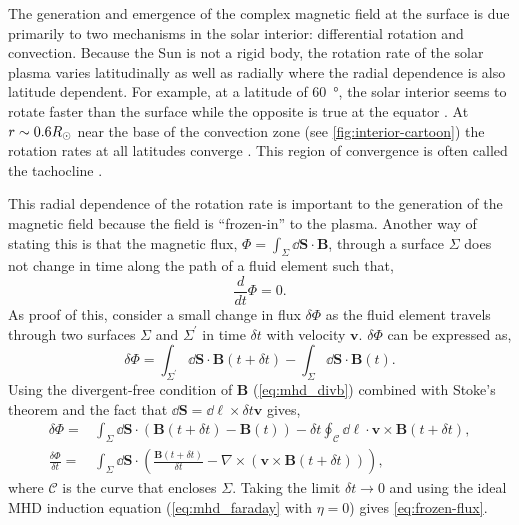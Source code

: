 The generation and emergence of the complex magnetic field at the surface is due primarily to two mechanisms in the solar interior: differential rotation and convection. Because the Sun is not a rigid body, the rotation rate of the solar plasma varies latitudinally as well as radially where the radial dependence is also latitude dependent. For example, at a latitude of \SI{60}{\degree}, the solar interior seems to rotate faster than the surface while the opposite is true at the equator \citep{thompson_differential_1996}. At $r\sim0.6R_\odot$ near the base of the convection zone (see \autoref{fig:interior-cartoon}) the rotation rates at all latitudes converge \citep{golub_solar_2010}. This region of convergence is often called the tachocline \citep{aschwanden_physics_2006}.

This radial dependence of the rotation rate is important to the generation of the magnetic field because the field is ``frozen-in'' to the plasma. Another way of stating this is that the magnetic flux, $\Phi=\int_\Sigma\dd{\mathbf{S}}\cdot\mathbf{B}$, through a surface $\Sigma$ does not change in time along the path of a fluid element such that,
\begin{equation}\label{eq:frozen-flux}
    \frac{d}{dt}\Phi = 0.
\end{equation}
As proof of this, consider a small change in flux $\delta\Phi$ as the fluid element travels through two surfaces $\Sigma$ and $\Sigma^\prime$ in time $\delta t$ with velocity $\mathbf{v}$. $\delta\Phi$ can be expressed as,
\begin{equation*}
    \delta\Phi = \int_{\Sigma^\prime}\dd{\mathbf{S}}\cdot\mathbf{B}(t+\delta t) - \int_\Sigma\dd{\mathbf{S}}\cdot\mathbf{B}(t).
\end{equation*}
Using the divergent-free condition of $\mathbf{B}$ (\autoref{eq:mhd_divb}) combined with Stoke's theorem and the fact that $\dd{\mathbf{S}}=\dd{\bm{\ell}}\times\delta t\mathbf{v}$ gives,
\begin{align}
    \delta\Phi =& \int_\Sigma\dd{\mathbf{S}}\cdot(\mathbf{B}(t+\delta t) - \mathbf{B}(t)) - \delta t\oint_\mathcal{C}\dd{\bm{\ell}}\cdot\mathbf{v}\times\mathbf{B}(t + \delta t), \nonumber\\
    \frac{\delta\Phi}{\delta t} =& \int_\Sigma\dd{\mathbf{S}}\cdot\left( \frac{\mathbf{B}(t+\delta t)}{\delta t} - \nabla\times(\mathbf{v}\times\mathbf{B}(t + \delta t)) \right),\nonumber
\end{align}
where $\mathcal{C}$ is the curve that encloses $\Sigma$. Taking the limit $\delta t\to0$ and using the ideal MHD induction equation (\autoref{eq:mhd_faraday} with $\eta=0$) gives \autoref{eq:frozen-flux}.

